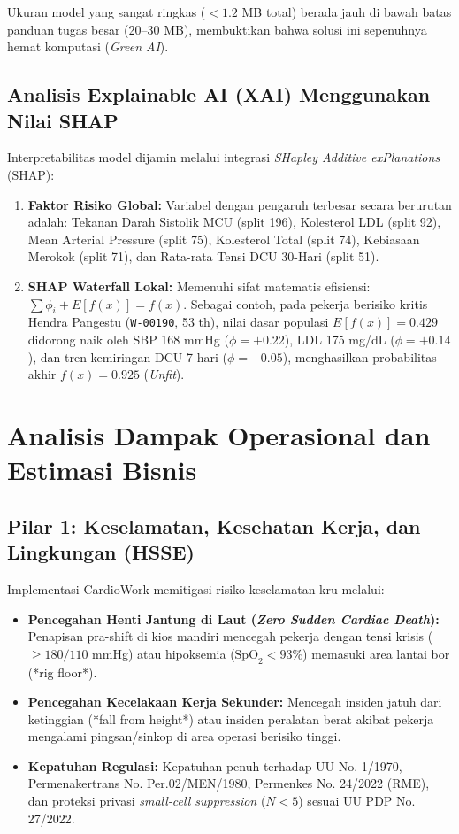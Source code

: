 \documentclass[a4paper,11pt]{article}
\begin{document}
Ukuran model yang sangat ringkas ($< 1.2$ MB total) berada jauh di bawah batas panduan tugas besar (20--30 MB), membuktikan bahwa solusi ini sepenuhnya hemat komputasi (\textit{Green AI}).

\subsection{Analisis Explainable AI (XAI) Menggunakan Nilai SHAP}
Interpretabilitas model dijamin melalui integrasi \textit{SHapley Additive exPlanations} (SHAP):
\begin{enumerate}[leftmargin=*]
    \item \textbf{Faktor Risiko Global:} Variabel dengan pengaruh terbesar secara berurutan adalah: Tekanan Darah Sistolik MCU (split 196), Kolesterol LDL (split 92), Mean Arterial Pressure (split 75), Kolesterol Total (split 74), Kebiasaan Merokok (split 71), dan Rata-rata Tensi DCU 30-Hari (split 51).
    \item \textbf{SHAP Waterfall Lokal:} Memenuhi sifat matematis efisiensi: $\sum \phi_i + E[f(x)] = f(x)$. Sebagai contoh, pada pekerja berisiko kritis Hendra Pangestu (\texttt{W-00190}, 53 th), nilai dasar populasi $E[f(x)] = 0.429$ didorong naik oleh SBP 168 mmHg ($\phi = +0.22$), LDL 175 mg/dL ($\phi = +0.14$), dan tren kemiringan DCU 7-hari ($\phi = +0.05$), menghasilkan probabilitas akhir $f(x) = 0.925$ (\textit{Unfit}).
\end{enumerate}

\section{Analisis Dampak Operasional dan Estimasi Bisnis}

\subsection{Pilar 1: Keselamatan, Kesehatan Kerja, dan Lingkungan (HSSE)}
Implementasi CardioWork memitigasi risiko keselamatan kru melalui:
\begin{itemize}[leftmargin=*]
    \item \textbf{Pencegahan Henti Jantung di Laut (\textit{Zero Sudden Cardiac Death}):} Penapisan pra-shift di kios mandiri mencegah pekerja dengan tensi krisis ($\ge 180/110$ mmHg) atau hipoksemia ($\text{SpO}_2 < 93\%$) memasuki area lantai bor (*rig floor*).
    \item \textbf{Pencegahan Kecelakaan Kerja Sekunder:} Mencegah insiden jatuh dari ketinggian (*fall from height*) atau insiden peralatan berat akibat pekerja mengalami pingsan/sinkop di area operasi berisiko tinggi.
    \item \textbf{Kepatuhan Regulasi:} Kepatuhan penuh terhadap UU No. 1/1970, Permenakertrans No. Per.02/MEN/1980, Permenkes No. 24/2022 (RME), dan proteksi privasi \textit{small-cell suppression} ($N < 5$) sesuai UU PDP No. 27/2022.
\end{itemize}
\end{document}
